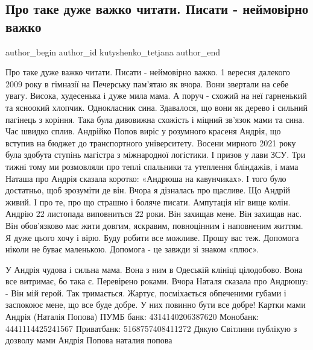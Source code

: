  
 
 
 
 
 
\subsection{Про таке дуже важко читати. Писати - неймовірно важко}
\label{sec:19_11_2022.fb.kutyshenko_tetjana.1.vazhko}
 
\ifcmt
 author_begin
   author_id kutyshenko_tetjana
 author_end
\fi

\obeycr
Про таке дуже важко читати.
Писати - неймовірно важко.
1 вересня далекого 2009 року в гімназії на Печерську пам'ятаю як вчора.
Вони звертали на себе увагу.
Висока, худесенька і дуже мила мама. 
А поруч - схожий на неї гарненький та ясноокий хлопчик. Однокласник сина.
Здавалося, що вони як дерево і сильний пагінець з коріння. Така була дивовижна схожість і міцний зв'язок мами та сина.
Час швидко сплив.
Андрійко Попов виріс у розумного красеня Андрія, що вступив на бюджет до транспортного університету.
Восени мирного 2021 року була здобута ступінь магістра з міжнародної логістики.
І призов у лави ЗСУ.
Три тижні тому ми розмовляли про теплі спальники та утеплення бліндажів, і мама Наташа про Андрія сказала коротко: «Андрюша на кавунчиках». І того було достатньо, щоб зрозуміти де він.
Вчора я дізналась про щасливе. Що Андрій живий.
І про те, про що страшно і боляче писати.
Ампутація ніг вище колін.
Андрію 22 листопада виповниться 22 роки.
Він захищав мене. 
Він захищав нас.
Він обов'язково має жити довгим, яскравим, повноцінним і наповненим життям.
Я дуже цього хочу і вірю.
Буду робити все можливе.
Прошу вас теж.
Допомога ніколи не буває маленькою.
Допомога - це завжди зі знаком «плюс».
\restorecr

\obeycr
У Андрія чудова і сильна мама.
Вона з ним в Одеській клініці цілодобово.
Вона все витримає, бо така є.
Перевірено роками.
Вчора Наталя сказала про Андрюшу:
- Він мій герой. Так тримається.
Жартує, посміхається обпеченими губами і заспокоює мене, що все  буде добре.
У них повинно бути все добре!
Картки мами Андрія (Наталія Попова)
ПУМБ банк:
4314140206387620
Монобанк:
4441114425241567
Приватбанк:
5168757408411272
Дякую
Світлини публікую з дозволу мами Андрія Попова  наталия попова
\restorecr
